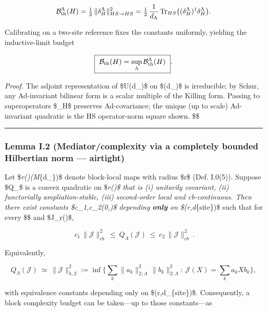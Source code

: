 \documentclass[
]{article}
\numberwithin{equation}{section}
\begin{document}
\[
\mathcal B^{\Lambda}_{\rm th}(H)=\tfrac12\,\|\delta_H^\Lambda\|_{HS\to HS}^2
=\tfrac12\,\frac1{d_\Lambda}\operatorname{Tr}_{HS}\!\big((\delta_H^\Lambda)^\dagger\delta_H^\Lambda\big).
\]

Calibrating on a two-site reference fixes the constants uniformly,
yielding the inductive-limit budget

\[
\boxed{\ \mathcal B_{\rm th}(H)=\sup_\Lambda \mathcal B^{\Lambda}_{\rm th}(H)\ }.
\]

\emph{Proof.} The adjoint representation of \$U(d\_\Lambda)\$ on
\$(d\_\Lambda)\$ is irreducible; by Schur, any Ad-invariant
bilinear form is a scalar multiple of the Killing form. Passing to
superoperators \$\delta\_H\$ preserves Ad-covariance; the unique (up to
scale) Ad-invariant quadratic is the HS operator-norm square shown.
\$\square\$

\begin{center}\rule{0.5\linewidth}{0.5pt}\end{center}

\hypertarget{lemma-i.2-mediatorcomplexity-via-a-completely-bounded-hilbertian-norm-airtight}{%
\subsubsection{Lemma I.2 (Mediator/complexity via a completely bounded
Hilbertian norm ---
airtight)}\label{lemma-i.2-mediatorcomplexity-via-a-completely-bounded-hilbertian-norm-airtight}}

Let
\$\emph{r(\Lambda)\subset {}(M}\{d\_\Lambda\})\$
denote block-local maps with radius \$\le r\$ (Def. I.0(5)). Suppose
\$Q\_\Lambda\$ is a convex quadratic on \$\emph{r(\Lambda)\$
that is (i) unitarily covariant, (ii) functorially ampliation-stable,
(iii) second-order local and cb-continuous. Then there exist constants
\$c\_1,c\_2\in(0,\infty)\$ depending \textbf{only} on
\$(r,d}\{\rm site\})\$ such that for every \$\Lambda\$ and
\$\mathcal J\in{}\_r(\Lambda)\$,

\[
\boxed{\ c_1\,\|\mathcal J\|_{cb}^2\ \le\ Q_\Lambda(\mathcal J)\ \le\ c_2\,\|\mathcal J\|_{cb}^2\ }.
\]

Equivalently,

\[
Q_\Lambda(\mathcal J)\ \simeq\ \|\mathcal J\|_{h,2}^2
:=\inf\Big\{\sum_{k}\|a_k\|_{2;\Lambda}^2\,\|b_k\|_{2;\Lambda}^2:\ \mathcal J(X)=\sum_k a_k X b_k\Big\},
\]

with equivalence constants depending only on \$(r,d\_\{\rm site\})\$.
Consequently, a block complexity budget can be taken---up to those
constants---as
\end{document}
